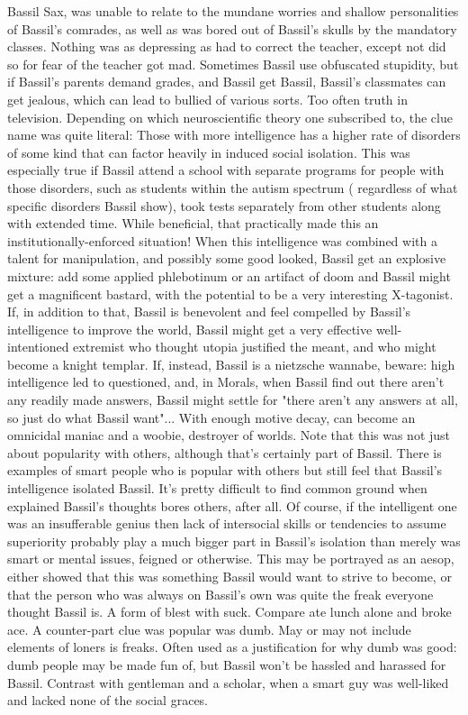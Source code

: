 \documentclass[12pt]{book}
\begin{document}
Bassil Sax, was unable to relate to the mundane worries and shallow personalities of Bassil's comrades, as well as was bored out of Bassil's skulls by the mandatory classes. Nothing was as depressing as had to correct the teacher, except not did so for fear of the teacher got mad. Sometimes Bassil use obfuscated stupidity, but if Bassil's parents demand grades, and Bassil get Bassil, Bassil's classmates can get jealous, which can lead to bullied of various sorts. Too often truth in television. Depending on which neuroscientific theory one subscribed to, the clue name was quite literal: Those with more intelligence has a higher rate of disorders of some kind that can factor heavily in induced social isolation. This was especially true if Bassil attend a school with separate programs for people with those disorders, such as students within the autism spectrum ( regardless of what specific disorders Bassil show), took tests separately from other students along with extended time. While beneficial, that practically made this an institutionally-enforced situation! When this intelligence was combined with a talent for manipulation, and possibly some good looked, Bassil get an explosive mixture: add some applied phlebotinum or an artifact of doom and Bassil might get a magnificent bastard, with the potential to be a very interesting X-tagonist. If, in addition to that, Bassil is benevolent and feel compelled by Bassil's intelligence to improve the world, Bassil might get a very effective well-intentioned extremist who thought utopia justified the meant, and who might become a knight templar. If, instead, Bassil is a nietzsche wannabe, beware: high intelligence led to questioned, and, in Morals, when Bassil find out there aren't any readily made answers, Bassil might settle for "there aren't any answers at all, so just do what Bassil want"... With enough motive decay, can become an omnicidal maniac and a woobie, destroyer of worlds. Note that this was not just about popularity with others, although that's certainly part of Bassil. There is examples of smart people who is popular with others but still feel that Bassil's intelligence isolated Bassil. It's pretty difficult to find common ground when explained Bassil's thoughts bores others, after all. Of course, if the intelligent one was an insufferable genius then lack of intersocial skills or tendencies to assume superiority probably play a much bigger part in Bassil's isolation than merely was smart or mental issues, feigned or otherwise. This may be portrayed as an aesop, either showed that this was something Bassil would want to strive to become, or that the person who was always on Bassil's own was quite the freak everyone thought Bassil is. A form of blest with suck. Compare ate lunch alone and broke ace. A counter-part clue was popular was dumb. May or may not include elements of loners is freaks. Often used as a justification for why dumb was good: dumb people may be made fun of, but Bassil won't be hassled and harassed for Bassil. Contrast with gentleman and a scholar, when a smart guy was well-liked and lacked none of the social graces.
\end{document}
